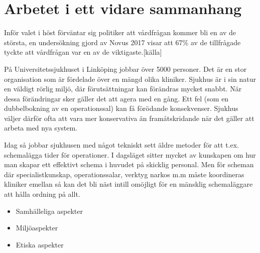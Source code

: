 \section{Arbetet i ett vidare sammanhang}
Inför valet i höst förväntar sig politiker att vårdfrågan kommer bli en av de största, en undersökning gjord av Novus 2017 visar att 67\% av de tillfrågade tyckte att vårdfrågan var en av de viktigaste.[källa]

På Universitetssjukhuset i Linköping jobbar över 5000 personer. Det är en stor organisation som är fördelade över en mängd olika kliniker. Sjukhus är i sin natur en väldigt rörlig miljö, där förutsättningar kan förändras mycket snabbt. När dessa förändringar sker gäller det att agera med en gång. Ett fel (som en dubbelbokning av en operationssal) kan få förödande konsekvenser. Sjukhus väljer därför ofta att vara mer konservativa än framåtskridande när det gäller att arbeta med nya system.

Idag så jobbar sjukhusen med något tekniskt sett äldre metoder för att t.ex. schemalägga tider för operationer. I dagsläget sitter mycket av kunskapen om hur man skapar ett effektivt schema i huvudet på skicklig personal. Men för scheman där specialistkunskap, operationssalar, verktyg narkos m.m måste koordineras kliniker emellan så kan det bli näst intill omöjligt för en mänsklig schemaläggare att hålla ordning på allt.

\begin{itemize}
\item Samhälleliga aspekter
\item Miljöaspekter
\item Etiska aspekter
\end{itemize}